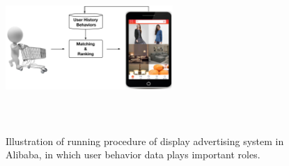 \begin{figure}
\centering
\includegraphics[height=2.5in, width=2.5in,keepaspectratio]{images/omni/sys4.png}
\caption{Illustration of running procedure of display advertising system in Alibaba, in which user behavior data plays important roles.}
\label{figure_display_ad_scenario}
\vspace{-0.4cm}
\end{figure}

 









